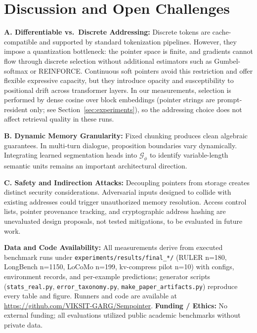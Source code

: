 \documentclass[conference]{IEEEtran}
\begin{document}
{\section{Discussion and Open Challenges}
\noindent\textbf{A. Differentiable vs.\ Discrete Addressing:}
Discrete tokens are cache-compatible and supported by standard tokenization pipelines. However, they impose a quantization bottleneck: the pointer space is finite, and gradients cannot flow through discrete selection without additional estimators such as Gumbel-softmax or REINFORCE. Continuous soft pointers avoid this restriction and offer flexible expressive capacity, but they introduce opacity and susceptibility to positional drift across transformer layers. In our measurements, selection is performed by dense cosine over block embeddings (pointer strings are prompt-resident only; see Section~\ref{sec:experiments}), so the addressing choice does not affect retrieval quality in these runs.

\noindent\textbf{B. Dynamic Memory Granularity:}
Fixed chunking produces clean algebraic guarantees. In multi-turn dialogue, proposition boundaries vary dynamically. Integrating learned segmentation heads into $\mathcal{G}_\phi$ to identify variable-length semantic units remains an important architectural direction.

\noindent\textbf{C. Safety and Indirection Attacks:}
Decoupling pointers from storage creates distinct security considerations. Adversarial inputs designed to collide with existing addresses could trigger unauthorized memory resolution. Access control lists, pointer provenance tracking, and cryptographic address hashing are unevaluated design proposals, not tested mitigations, to be evaluated in future work.





\vspace{0.1em}
\noindent\textbf{Data and Code Availability:} All measurements derive from executed benchmark runs under \texttt{experiments/results/final\_*/} (RULER n=180, LongBench n=1150, LoCoMo n=199, kv-compress pilot n=10) with configs, environment records, and per-example predictions; generator scripts (\texttt{stats\_real.py}, \texttt{error\_taxonomy.py}, \texttt{make\_paper\_artifacts.py}) reproduce every table and figure. Runners and code are available at \url{https://github.com/VIKSIT-GARG/Sempointer}. \textbf{Funding / Ethics:} No external funding; all evaluations utilized public academic benchmarks without private data.

}
\end{document}

